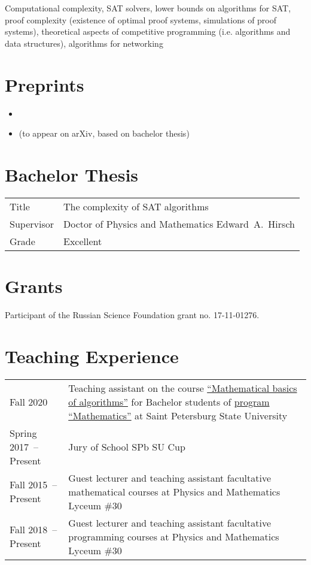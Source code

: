 \documentclass[a4paper, 11pt]{article}
\begin{document}
Computational complexity, SAT solvers, lower bounds on algorithms for SAT, proof complexity (existence of optimal proof systems, simulations of proof systems), theoretical aspects of competitive programming (i.e. algorithms and data structures), algorithms for networking

\section*{Preprints}

\begin{itemize}
    \item {}
    \item {} (to appear on arXiv, based on bachelor thesis)
\end{itemize}

\section*{Bachelor Thesis}

\begin{tabularx}{\textwidth}{lX}
    Title & The complexity of SAT algorithms \\
    Supervisor & Doctor of Physics and Mathematics Edward~A.~Hirsch \\
    Grade & Excellent
\end{tabularx}

\section*{Grants}

Participant of the Russian Science Foundation grant no. 17-11-01276.

\section*{Teaching Experience}

\begin{tabularx}{\textwidth}{lX}
    Fall 2020 & Teaching assistant on the course \href{https://users.math-cs.spbu.ru/~okhotin/teaching/algorithms_2020/}{``Mathematical basics of algorithms''} for Bachelor students of \href{https://math-cs.spbu.ru/en/}{program ``Mathematics''} at Saint Petersburg State University \\

    Spring 2017~-- Present & Jury of School SPb SU Cup \\

    Fall 2015~-- Present & Guest lecturer and teaching assistant facultative mathematical courses at Physics and Mathematics Lyceum \#30 \\
    
    Fall 2018~-- Present & Guest lecturer and teaching assistant facultative programming courses at Physics and Mathematics Lyceum \#30
\end{tabularx}
\end{document}
